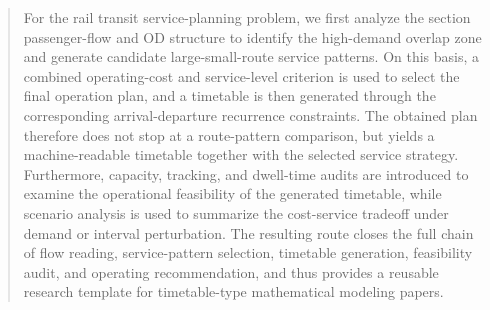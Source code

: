 \begin{abstract}
For the rail transit service-planning problem, we first analyze the section passenger-flow and OD structure to identify the high-demand overlap zone and generate candidate large-small-route service patterns. On this basis, a combined operating-cost and service-level criterion is used to select the final operation plan, and a timetable is then generated through the corresponding arrival-departure recurrence constraints. The obtained plan therefore does not stop at a route-pattern comparison, but yields a machine-readable timetable together with the selected service strategy. Furthermore, capacity, tracking, and dwell-time audits are introduced to examine the operational feasibility of the generated timetable, while scenario analysis is used to summarize the cost-service tradeoff under demand or interval perturbation. The resulting route closes the full chain of flow reading, service-pattern selection, timetable generation, feasibility audit, and operating recommendation, and thus provides a reusable research template for timetable-type mathematical modeling papers.

\end{abstract}
